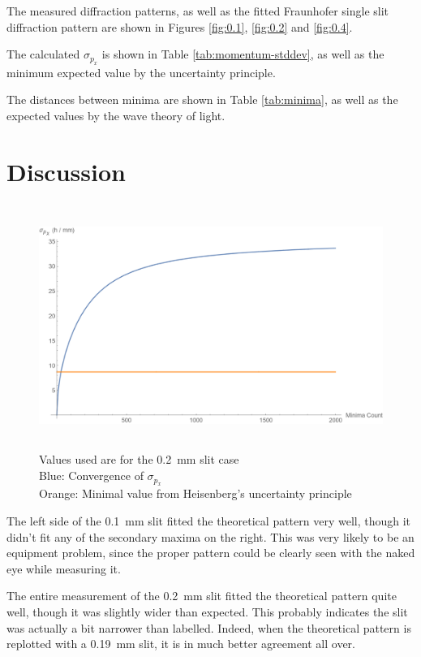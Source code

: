 \documentclass[a4paper]{scrartcl}
\begin{document}
The measured diffraction patterns, as well as the fitted Fraunhofer single slit diffraction pattern are shown in Figures \ref{fig:0.1}, \ref{fig:0.2} and \ref{fig:0.4}.

The calculated \(\sigma_{p_x}\) is shown in Table \ref{tab:momentum-stddev}, as well as the minimum expected value by the uncertainty principle.

The distances between minima are shown in Table \ref{tab:minima}, as well as the expected values by the wave theory of light.

\section{Discussion}
\begin{figure}
    \centering
    \includegraphics[height = 8cm]{stddev-convergence.png}
    \caption{
        Values used are for the \SI{0.2}{\milli\metre} slit case \\
        Blue: Convergence of \(\sigma_{p_x}\) \\
        Orange: Minimal value from Heisenberg's uncertainty principle
    }
    \label{fig:stddev-convergence}
\end{figure}

The left side of the \SI{0.1}{\milli\metre} slit fitted the theoretical pattern very well, though it didn't fit any of the secondary maxima on the right. This was very likely to be an equipment problem, since the proper pattern could be clearly seen with the naked eye while measuring it.

The entire measurement of the \SI{0.2}{\milli\metre} slit fitted the theoretical pattern quite well, though it was slightly wider than expected. This probably indicates the slit was actually a bit narrower than labelled. Indeed, when the theoretical pattern is replotted with a \SI{0.19}{\milli\metre} slit, it is in much better agreement all over.
\end{document}
